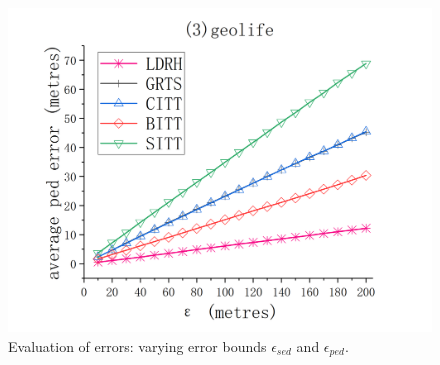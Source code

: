 {{\begin{figure}[tb!]
	\includegraphics[scale = 0.555]{figures/Fig-geolife-ped-error.png}\hspace{0ex}
	\vspace{-2ex}
	\caption{\small Evaluation of \ped errors: varying error bounds $\epsilon_{sed}$ and $\epsilon_{ped}$.}
	\label{fig:ped-error}
	\vspace{-1ex}
\end{figure}

}}
